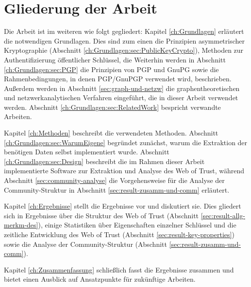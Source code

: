 \section{Gliederung der Arbeit}
\label{ch:Einleitung:sec:Gliederung}

Die Arbeit ist im weiteren wie folgt gegliedert: Kapitel
\ref{ch:Grundlagen} erläutert die notwendigen Grundlagen. Dies sind
zum einen die Prinzipien asymmetrischer Kryptographie (Abschnitt
\ref{ch:Grundlagen:sec:PublicKeyCrypto}), Methoden zur
Authentifizierung öffentlicher Schlüssel, die Weiterhin werden in
Abschnitt \ref{ch:Grundlagen:sec:PGP} die Prinzipien von PGP und GnuPG
sowie die Rahmenbedingungen, in denen PGP/GnuPGP verwendet wird,
beschrieben. Außerdem werden in Abschnitt \ref{sec:graph-und-netzw}
die graphentheoretischen und netzwerkanalytischen Verfahren
eingeführt, die in dieser Arbeit verwendet werden. Abschnitt
\ref{ch:Grundlagen:sec:RelatedWork} bespricht verwandte Arbeiten.

Kapitel \ref{ch:Methoden} beschreibt die verwendeten
Methoden. Abschnitt \ref{ch:Grundlagen:sec:WarumEigene} begründet
zunächst, warum die Extraktion der benötigen Daten selbst
implementiert wurde. Abschnitt \ref{ch:Grundlagen:sec:Design} beschreibt die
im Rahmen dieser Arbeit implementierte Software zur Extraktion und
Analyse des Web of Trust, während Abschnitt
\ref{sec:community-analyse} die Vorgehensweise für die Analyse der
Community-Struktur in Abschnitt \ref{sec:result-zusamm-und-comm}
erläutert.

Kapitel \ref{ch:Ergebnisse} stellt die Ergebnisse vor und
diskutiert sie. Dies gliedert sich in Ergebnisse über die Struktur
des Web of Trust (Abschnitt \ref{sec:result-allg-merkm-des}), einige
Statistiken über Eigenschaften einzelner Schlüssel und die
zeitliche Entwicklung des Web of Trust (Abschnitt
\ref{sec:result-key-properties}) sowie die Analyse der
Community-Struktur (Abschnitt \ref{sec:result-zusamm-und-comm}).

Kapitel \ref{ch:Zusammenfassung} schließlich fasst die Ergebnisse
zusammen und bietet einen Ausblick auf Ansatzpunkte für zukünftige
Arbeiten.

